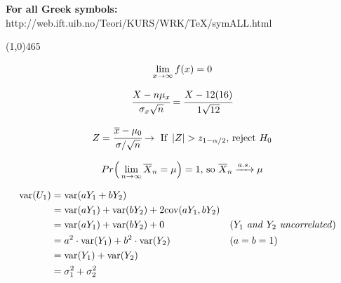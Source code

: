 \documentclass[12pt]{article}
\newenvironment{tightcenter}{%
  \setlength\topsep{0pt}
  \setlength\parskip{0pt}
  \begin{center}
}{%
  \end{center}
}
\begin{document}
\textbf{For all Greek symbols:} http://web.ift.uib.no/Teori/KURS/WRK/TeX/symALL.html

\newpage


\begin{tightcenter}
\line(1,0){465}
\end{tightcenter}

\begin{equation} \label{eq3}
\lim\displaylimits_{x \rightarrow \infty}f(x) = 0
\end{equation}

$$ \cfrac{X-n\mu_{x}}{\sigma_{x}\sqrt{n}} = \cfrac{X-12(16)}{1\sqrt{12}} $$

$$ Z = \cfrac{\overline{x} - \mu_{0}}{\sigma / \sqrt{n}} \rightarrow \text{ If }\left| Z \right| > z_{1-\alpha/2}\text{, reject }H_{0} $$

$$ Pr\Big(\lim\displaylimits_{n \rightarrow \infty} \overline{X}_{n} = \mu \Big) = 1 \text{, so } \overline{X}_{n} \xrightarrow{a.s.} \mu $$

\begin{align*}
    \text{var}(U_{1})&= \text{var}(aY_{1} + bY_{2})\\
    &= \text{var}(aY_{1}) + \text{var}(bY_{2}) + 2\text{cov}(aY_{1},bY_{2})\\
    &= \text{var}(aY_{1}) + \text{var}(bY_{2}) + 0&& (Y_{1} \text{ \textit{and} } Y_{2} \text{ \textit{uncorrelated})} \\
    &=a^{2} \cdot \text{var}(Y_{1}) + b^{2} \cdot \text{var}(Y_{2}) && (a = b = 1)\\
    &=\text{var}(Y_{1}) + \text{var}(Y_{2}) \\
    &= \sigma_{1}^{2} + \sigma_{2}^{2}\\
\end{align*}
\end{document}
